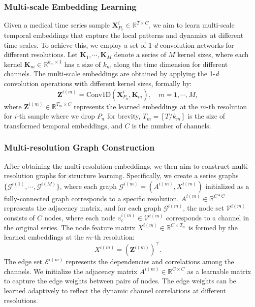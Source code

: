 \subsubsection{Multi-scale Embedding Learning}
Given a medical time series sample $\mathbf{X}^{i}_{P_n} \in \mathbb{R}^{T \times C}$, we aim to learn multi-scale temporal embeddings that capture the local patterns and dynamics at different time scales. To achieve this, we employ a set of 1-\textit{d} convolution networks for different resolutions. Let ${\mathbf{K}_1, \cdots, \mathbf{K}_M}$ denote a series of $M$ kernel sizes, where each kernel $\mathbf{K}_m \in \mathbb{R}^{k_m \times 1}$ has a size of $k_m$ along the time dimension for different channels.
The multi-scale embeddings are obtained by applying the 1-\textit{d} convolution operations with different kernel sizes, formally by:
\begin{equation}
\mathbf{Z}^{i (m)} = \text{Conv1D}(\mathbf{X}^{i}_{P_n}, \mathbf{K}_m), \quad m = 1, \cdots, M,
\end{equation}
where $\mathbf{Z}^{i (m)} \in \mathbb{R}^{T_m \times C}$ represents the learned embeddings at the $m$-th resolution for $i$-th sample where we drop $P_n$ for brevity, $T_m = [T / k_m]$ is the size of transformed temporal embeddings, and $C$ is the number of  channels.

\subsubsection{Multi-resolution Graph Construction}
After obtaining the multi-resolution embeddings, we then aim to construct  multi-resolution graphs for structure learning. Specifically,  we create a series graphs $\{\mathcal{G}^{i (1)}, \cdots, \mathcal{G}^{i (M)}\}$, where each graph $\mathcal{G}^{i (m)} = ({A}^{i(m)}, {X}^{i(m)})$ initialized as a fully-connected graph corresponds to a specific resolution.  ${A}^{i(m)} \in \mathbb{R}^{C*C} $ represents the adjacency matrix, 
and for each graph $\mathcal{G}^{i(m)}$, the node set $\mathcal{V}^{i(m)}$ consists of $C$ nodes, where each node $v^{i(m)}_c \in \mathcal{V}^{i(m)}$ corresponds to a channel in the original series. The node feature matrix ${X}^{i(m)} \in \mathbb{R}^{C \times T_m}$ is formed by the learned embeddings at the $m$-th resolution:
\begin{equation}
{X}^{i(m)} = (\mathbf{Z}^{i (m)})^{\top}.
\end{equation}
The edge set $\mathcal{E}^{i(m)}$ represents the dependencies and correlations among the channels. We initialize the adjacency matrix ${A}^{i(m)} \in \mathbb{R}^{C \times C}$ as a learnable matrix to capture the edge weights between pairs of nodes. The edge weights can be learned adaptively to reflect the dynamic channel correlations at different resolutions.


